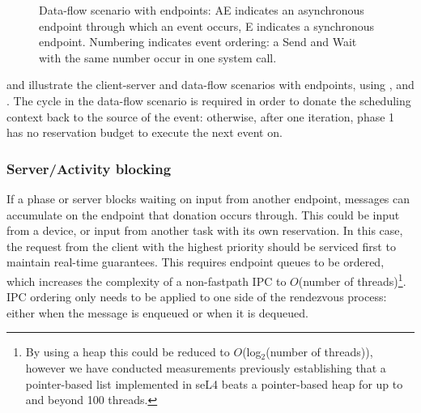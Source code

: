 \begin{figure}
\centering
\caption{Data-flow scenario with endpoints: AE indicates an asynchronous endpoint through which an event occurs, E indicates a synchronous endpoint. Numbering indicates event ordering: a Send and Wait with the same number occur in one system call.}
\label{fig:dataflow-endpoint}
\end{figure}

 and  illustrate the client-server and data-flow scenarios with endpoints, using \call, \replyrecv and \sendrecv.
The cycle in the data-flow scenario is required in order to donate the scheduling context back to the source of the event: otherwise, after one iteration, phase 1 has no reservation budget to execute the next event on.
\subsubsection{Server/Activity blocking}

If a phase or server blocks waiting on input from another endpoint, messages can accumulate on the endpoint that donation occurs through.
This could be input from a device, or input from another task with its own reservation.
In this case, the request from the client with the highest priority should be serviced first to maintain real-time guarantees.
This requires endpoint queues to be ordered, which increases the complexity of a non-fastpath IPC to $O$(number of threads)\footnote{By using a heap this could be reduced to $O$(log$_{2}$(number of threads)), however we have conducted measurements previously establishing that a pointer-based list implemented in seL4 beats a pointer-based heap for up to and beyond 100 threads.}.
IPC ordering only needs to be applied to one side of the rendezvous process: either when the message is enqueued or when it is dequeued.

